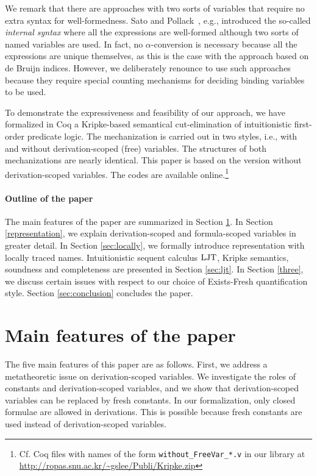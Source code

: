 \documentclass{svjour3}                     %
\newcommand{\ljt}{\textup{LJT}}
\begin{document}
We remark that there are approaches with two sorts of variables that require no extra syntax for well-formedness. Sato and Pollack~\cite{sapol}, e.g., introduced the so-called \textit{internal syntax} where all the expressions are well-formed although two sorts of named variables are used. In fact, no $\alpha$-conversion is necessary because all the expressions are unique themselves, as this is the case with the approach based on de Bruijn indices. However, we deliberately renounce to use such approaches because they require special counting mechanisms for deciding binding variables to be used.

To demonstrate the expressiveness and feasibility of our approach, we have formalized in Coq a Kripke-based semantical cut-elimination of intuitionistic first-order predicate logic. 
The mechanization is carried out in two styles, i.e., with and without derivation-scoped (free) variables. The structures of both mechanizations are nearly identical. This paper is based on the version without derivation-scoped variables.
The codes are available online.\footnote{Cf. Coq files with names of the form \verb|without_FreeVar_*.v| in our library at \url{http://ropas.snu.ac.kr/~gslee/Publi/Kripke.zip}} 

\paragraph{Outline of the paper}
The main features of the paper are summarized in Section \ref{features}. In Section \ref{representation}, we explain  derivation-scoped and formula-scoped variables in greater detail. In Section \ref{sec:locally}, we formally introduce representation with locally traced names. Intuitionistic sequent calculus $\ljt$, Kripke semantics, soundness and completeness are presented in Section \ref{sec:ljt}. In Section \ref{three}, we discuss certain issues with respect to our choice of Exists-Fresh quantification style. Section \ref{sec:conclusion} concludes the paper.

\section{Main features of the paper}\label{features}
The five main features of this paper are as follows. 
First, we address a metatheoretic issue on derivation-scoped variables. We investigate the roles of constants and derivation-scoped variables, and we show that derivation-scoped variables can be replaced by fresh constants. In our formalization, only closed formulae are allowed in derivations. This is possible because fresh constants are used instead of  derivation-scoped variables.
  
\end{document}
